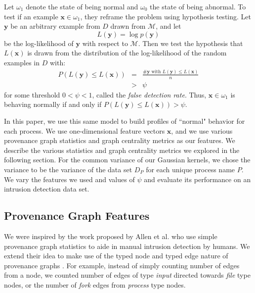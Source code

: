 \documentclass[10pt,twocolumn]{article}
\newcommand{\m}[1]{\mathbf{#1}}
\begin{document}
Let $\omega_1$ denote the state of being normal and $\omega_0$ the state of being abnormal.
To test if an example $\m{x} \in \omega_1$, they reframe the problem using hypothesis testing. Let $\m{y}$ be
an arbitrary example from $D$ drawn from $\mathcal{M}$, and let 
$$L(\m{y}) = \log p(\m{y})$$
be the log-likelihood of $\m{y}$ with respect to $\mathcal{M}$. Then we test the hypothesis that
$L(\m{x})$ is drawn from the distribution of the log-likelihood of the random examples in $D$ with:
\begin{eqnarray*}
P(L(\m{y}) \leq L(\m{x})) 
&=&  \frac{\#\m{y} \mbox { with } L(\m{y}) \leq L(\m{x})}{n} \\
&>& \psi
\end{eqnarray*}
for some threshold $0 < \psi < 1$, called the {\em false detection rate}. 
Thus, $\m{x} \in \omega_1$ is behaving normally if and only if $P(L(\m{y}) \leq L(\m{x})) > \psi$. 

In this paper, we use this same model to build profiles of ``normal" behavior for each process. We use
one-dimensional feature vectors $\m{x}$, and we use various provenance graph statistics and graph
centrality metrics as our features. We describe the various statistics and graph centrality metrics we explored
in the following section. For the common variance of our Gaussian kernels, we chose
the variance to be the variance of the data set $D_P$ for each unique process name $P$. 
We vary the features we used and values of $\psi$ and evaluate its performance on an intrusion detection data set.

\subsection{Provenance Graph Features}

We were inspired by the work proposed by Allen et al. who use simple provenance graph statistics to aide
in manual intrusion detection by humans. We extend their idea to make use of the typed node and typed edge
nature of provenance graphs \cite{provstat}. For example, instead of simply counting number of edges from a node, we
counted number of edges of type {\em input} directed towards {\em file} type nodes, or the number of {\em fork}
edges from {\em process} type nodes.
\end{document}
